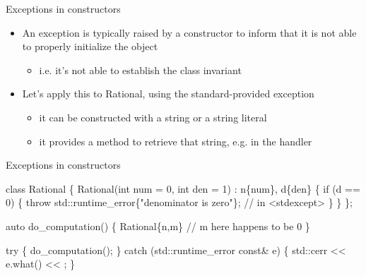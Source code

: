 \begin{frame}[fragile]{Exceptions in constructors}

  \begin{itemize}
  \item An exception is typically raised by a constructor to inform that it is
    not able to properly initialize the object
    \begin{itemize}
    \item i.e. it's not able to establish the class invariant
    \end{itemize}
  \item Let's apply this to Rational, using the standard-provided exception 
    \begin{itemize}
    \item it can be constructed with a string or a string literal
    \item it provides a  method to retrieve that string, e.g. in
      the handler
    \end{itemize}
  \end{itemize}

\end{frame}

\begin{frame}[fragile]{Exceptions in constructors \insertcontinuationtext}

    \begin{codeblock}
class Rational \{
  \ddd
  Rational(int num = 0, int den = 1) : n\{num\}, d\{den\} \{
    if (d == 0) \{
      \alert{throw} std::runtime_error\{"denominator is zero"\}; // in <stdexcept>
    \}
    \ddd
  \}
\};

auto do_computation() \{
  \ddd
  Rational\{n,m\} // m here happens to be 0
  \ddd  
\}

\alert{try} \{
  do_computation();
  \ddd
\} \alert{catch} (std::runtime_error const& e) \{
  std::cerr << e.what() << \bslashn;
\}\end{codeblock}

\end{frame}

